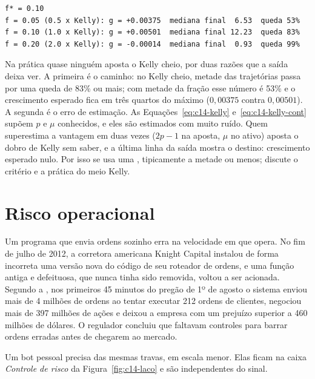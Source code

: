 \begin{lstlisting}[style=saida]
f* = 0.10
f = 0.05 (0.5 x Kelly): g = +0.00375  mediana final  6.53  queda 53%
f = 0.10 (1.0 x Kelly): g = +0.00501  mediana final 12.23  queda 83%
f = 0.20 (2.0 x Kelly): g = -0.00014  mediana final  0.93  queda 99%
\end{lstlisting}


Na prática quase ninguém aposta o Kelly cheio, por duas razões que a saída deixa ver. A primeira é o caminho: no Kelly cheio, metade das trajetórias passa por uma queda de 83\% ou mais; com metade da fração esse número é 53\% e o crescimento esperado fica em três quartos do máximo ($0,00375$ contra $0,00501$). A segunda é o erro de estimação. As Equações~\eqref{eq:c14-kelly} e~\eqref{eq:c14-kelly-cont} supõem $p$ e $\mu$ conhecidos, e eles são estimados com muito ruído. Quem superestima a vantagem em duas vezes ($2p - 1$ na aposta, $\mu$ no ativo) aposta o dobro de Kelly sem saber, e a última linha da saída mostra o destino: crescimento esperado nulo. Por isso se usa uma , tipicamente a metade ou menos; \citet{chan2021} discute o critério e a prática do meio Kelly.

\section{Risco operacional}
\label{sec:c14-risco}

Um programa que envia ordens sozinho erra na velocidade em que opera. No fim de julho de 2012, a corretora americana Knight Capital instalou de forma incorreta uma versão nova do código de seu roteador de ordens, e uma função antiga e defeituosa, que nunca tinha sido removida, voltou a ser acionada. Segundo a \citet{sec2013}, nos primeiros 45 minutos do pregão de 1º de agosto o sistema enviou mais de 4 milhões de ordens ao tentar executar 212 ordens de clientes, negociou mais de 397 milhões de ações e deixou a empresa com um prejuízo superior a 460 milhões de dólares. O regulador concluiu que faltavam controles para barrar ordens erradas antes de chegarem ao mercado.

Um bot pessoal precisa das mesmas travas, em escala menor. Elas ficam na caixa \emph{Controle de risco} da Figura~\ref{fig:c14-laco} e são independentes do sinal.

